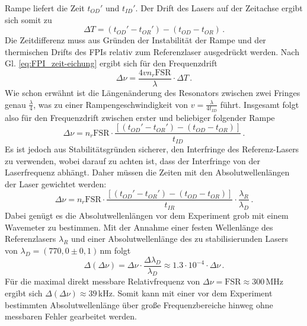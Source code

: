 Rampe liefert die Zeit $t_{OD}'$ und $t_{ID}'$. Der Drift des Lasers auf der
Zeitachse ergibt sich somit zu
\begin{equation}\label{eq:FPI_zeitdrift}
	\Delta T=\left(t_{OD}'-t_{OR}'\right)-\left(t_{OD}-t_{OR}\right)\,.
\end{equation}
Die Zeitdifferenz muss aus Gründen der Instabilität der Rampe und der
thermischen Drifts des FPIs relativ zum Referenzlaser ausgedrückt werden. Nach
Gl.
\eqref{eq:FPI_zeit-eichung} ergibt sich für den Frequenzdrift
\begin{equation}\label{eq:FPI_frequenzdrift_01}
	\Delta\nu=\frac{4vn_r\text{FSR}}{\lambda}\cdot\Delta T\,.
\end{equation}
Wie schon erwähnt ist die Längenänderung des Resonators zwischen zwei Fringes
genau $\frac{\lambda}{4}$, was zu einer Rampengeschwindigkeit von
$v=\frac{\lambda}{4t_{ID}}$ führt. Insgesamt folgt also für den Frequenzdrift
zwischen erster und beliebiger folgender Rampe
\begin{equation}\label{eq:FPI_frequenzdrift_02}
	\Delta\nu=n_r\text{FSR}\cdot\frac{\left[\left(t_{OD}'-t_{OR}'\right)-\left(t_{OD}-t_{OR}\right)\right]}{t_{ID}}\,.
\end{equation}
Es ist jedoch aus Stabilitätsgründen sicherer, den Interfringe des
Referenz-Lasers zu verwenden, wobei darauf zu achten ist, dass der Interfringe
von der Laserfrequenz abhängt. Daher müssen die Zeiten mit den
Absolutwellenlängen der Laser gewichtet werden:
\begin{equation}\label{eq:FPI_frequenzdrift_02}
	\Delta\nu=n_r\text{FSR}\cdot\frac{\left[\left(t_{OD}'-t_{OR}'\right)-\left(t_{OD}-t_{OR}\right)\right]}{t_{IR}}\cdot\frac{\lambda_R}{\lambda_D}\,.
\end{equation}
Dabei genügt es die Absolutwellenlängen vor dem Experiment grob mit einem
Wavemeter zu bestimmen. Mit der Annahme einer festen Wellenlänge
des Referenzlasers $\lambda_R$ und einer Absolutwellenlänge
des zu stabilisierunden Lasers von $\lambda_D=(770,0\pm0,1)\,$nm folgt
\begin{equation}\label{eq:FPI_frequenzdrift_fehler}
	\Delta(\Delta\nu)=\Delta\nu\cdot\frac{\Delta\lambda_D}{\lambda_D}\approx1.3\cdot10^{-4}\cdot\Delta\nu\,.
\end{equation}
Für die maximal direkt messbare Relativfrequenz von
$\Delta\nu=\text{FSR}\approx300\,$MHz ergibt sich
$\Delta(\Delta\nu)\approx39\,$kHz. Somit kann mit einer vor
dem Experiment bestimmten Absolutwellenlänge über große Frequenzbereiche hinweg
ohne messbaren Fehler gearbeitet werden.\par
